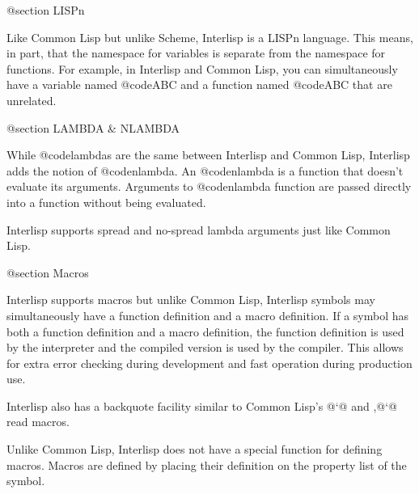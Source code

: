 @section LISPn

Like Common Lisp but unlike Scheme, Interlisp is a LISPn language.
This means, in part, that the namespace for variables is separate from
the namespace for functions.  For example, in Interlisp and
Common Lisp, you can simultaneously have a variable named @code{ABC}
and a function named @code{ABC} that are unrelated.


@section LAMBDA & NLAMBDA

While @code{lambda}s are the same between Interlisp and Common Lisp,
Interlisp adds the notion of @code{nlambda}.  An @code{nlambda} is
a function that doesn't evaluate its arguments.  Arguments to 
@code{nlambda} function are passed directly into a function without 
being evaluated.

Interlisp supports spread and no-spread lambda arguments just like
Common Lisp.

@section Macros

Interlisp supports macros but unlike Common Lisp, Interlisp symbols
may simultaneously have a function definition and a macro definition.
If a symbol has both a function definition and a macro definition, the
function definition is used by the interpreter and the compiled version
is used by the compiler.  This allows for extra error checking during 
development and fast operation during production use.

Interlisp also has a backquote facility similar to Common Lisp's @`@
and ,@`@ read macros.

Unlike Common Lisp, Interlisp does not have a special function for
defining macros.  Macros are defined by placing their definition on
the property list of the symbol.



